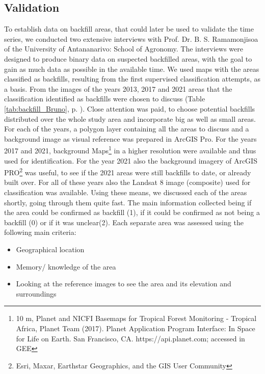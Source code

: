 \documentclass[11pt, A4, oneside]{report}
\begin{document}
\subsection{Validation}\label{sect:BF-ts-validation}
To establish data on backfill areas, that could later be used to validate the time series, we conducted two extensive interviews with Prof. Dr. B. S. Ramamonjisoa of the University of Antananarivo: School of Agronomy. The interviews were designed to produce binary data on suspected backfilled areas, with the goal to gain as much data as possible in the available time. We used maps with the areas classified as backfills, resulting from the first supervised classification attempts, as a basis. From the images of the years 2013, 2017 and 2021 areas  that the classification identified as backfills were chosen to discuss (Table \ref{tab:backfill_Bruno}, p. \pageref{tab:backfill_Bruno}). Close attention was paid, to choose potential backfills distributed over the whole study area and incorporate  big as well as small areas. For each of the years, a polygon layer containing all the areas to discuss and a background image as visual reference was prepared in ArcGIS Pro. For the years 2017 and 2021, background Maps\footnote{10 m, Planet and NICFI Basemaps for Tropical Forest Monitoring - Tropical Africa, Planet Team (2017). Planet Application Program Interface: In Space for Life on Earth. San Francisco, CA. https://api.planet.com; accessed in GEE} 
in a higher resolution  were available and thus used for identification. For the year 2021 also the background imagery of ArcGIS PRO\footnote{Esri, Maxar, Earthstar Geographics, and the GIS User Community} 
was useful, to see if the 2021 areas were still backfills to date, or already built over. For all of these years also the Landsat 8 image (composite) used for classification was available. Using these means, we discussed each of the areas shortly, going through them quite fast. The main information collected being if the area could be confirmed as backfill (1), if it could be confirmed as not being a backfill (0) or if it was unclear(2). %
Each separate area was assessed using the following main criteria:
\begin{itemize}
\item Geographical location
\item Memory/ knowledge of the area
\item Looking at the reference images to see the area and its elevation and surroundings
\end{itemize}
\end{document}
